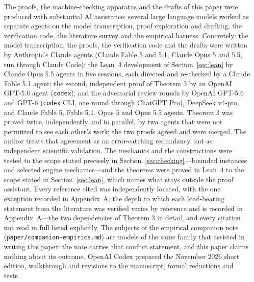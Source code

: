 \documentclass[11pt,a4paper]{article}
\theoremstyle{plain}
\theoremstyle{definition}
\theoremstyle{plain}
\theoremstyle{definition}
\theoremstyle{remark}
\newcommand{\src}[1]{\texttt{#1}}
\begin{document}
The proofs, the machine-checking apparatus and the drafts of this paper were produced with
substantial AI assistance: several large language models worked as separate agents on the model
transcription, proof exploration and drafting, the verification code, the literature survey and
the empirical harness. Concretely: the model transcription, the proofs, the verification code
and the drafts were written by Anthropic's Claude agents (Claude Fable 5 and 5.1, Claude Opus 5 and 5.5,
run through Claude Code); the Lean~4 development of Section~\ref{sec:lean} by Claude Opus 5.5
agents in five sessions, each directed and re-checked by a Claude Fable 5.1 agent; the
second, independent proof of Theorem 3 by an OpenAI GPT-5.6 agent
(\src{codex}); and the adversarial review rounds by OpenAI GPT-5.6 and GPT-6 (\src{codex} CLI,
one round through ChatGPT Pro), DeepSeek v4-pro, and Claude Fable 5, Fable 5.1, Opus 5 and
Opus 5.5 agents. Theorem 3 was proved twice, independently and in parallel, by two agents
that were not permitted to see each other's work; the two proofs agreed and were merged. The
author treats that agreement as an error-catching redundancy, not as independent scientific
validation. The mechanics and the constructions were tested to the scope stated precisely in
Section~\ref{sec:checking}---bounded instances and selected engine mechanics---and the theorems
were proved in Lean~4 to the scope stated in Section~\ref{sec:lean}, which names what stays
outside the proof assistant. Every reference cited was independently located, with the one exception recorded in
Appendix~A; the depth to
which each load-bearing statement from the literature was verified varies by reference and is
recorded in Appendix~A---the two dependencies of Theorem 3 in detail, and every citation not
read in full listed explicitly. The subjects of the empirical companion note
(\src{paper/companion-empirics.md}) are models of the same family that assisted in writing
this paper; the note carries that conflict statement, and this paper claims nothing about
its outcome. OpenAI Codex prepared the November 2026 short edition, walkthrough and revisions to the manuscript, formal reductions and tests.
\end{document}
